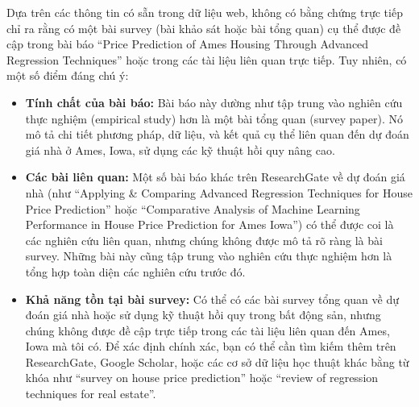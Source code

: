 

Dựa trên các thông tin có sẵn trong dữ liệu web, không có bằng chứng trực tiếp chỉ ra rằng có một bài survey (bài khảo sát hoặc bài tổng quan) cụ thể được đề cập trong bài báo ``Price Prediction of Ames Housing Through Advanced Regression Techniques'' hoặc trong các tài liệu liên quan trực tiếp. Tuy nhiên, có một số điểm đáng chú ý:

\begin{itemize}[label=$\bullet$]
    \item \textbf{Tính chất của bài báo:} Bài báo này dường như tập trung vào nghiên cứu thực nghiệm (empirical study) hơn là một bài tổng quan (survey paper). Nó mô tả chi tiết phương pháp, dữ liệu, và kết quả cụ thể liên quan đến dự đoán giá nhà ở Ames, Iowa, sử dụng các kỹ thuật hồi quy nâng cao.
    \item \textbf{Các bài liên quan:} Một số bài báo khác trên ResearchGate về dự đoán giá nhà (như ``Applying \& Comparing Advanced Regression Techniques for House Price Prediction'' hoặc ``Comparative Analysis of Machine Learning Performance in House Price Prediction for Ames Iowa'') có thể được coi là các nghiên cứu liên quan, nhưng chúng không được mô tả rõ ràng là bài survey. Những bài này cũng tập trung vào nghiên cứu thực nghiệm hơn là tổng hợp toàn diện các nghiên cứu trước đó.
    \item \textbf{Khả năng tồn tại bài survey:} Có thể có các bài survey tổng quan về dự đoán giá nhà hoặc sử dụng kỹ thuật hồi quy trong bất động sản, nhưng chúng không được đề cập trực tiếp trong các tài liệu liên quan đến Ames, Iowa mà tôi có. Để xác định chính xác, bạn có thể cần tìm kiếm thêm trên ResearchGate, Google Scholar, hoặc các cơ sở dữ liệu học thuật khác bằng từ khóa như ``survey on house price prediction'' hoặc ``review of regression techniques for real estate''.
\end{itemize}

